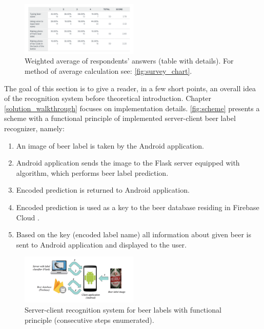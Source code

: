 \documentclass[11pt]{article}
\begin{document}
\begin{figure}[h]
\includegraphics[width=0.5\textwidth]{survey_table}
\centering
\caption{Weighted average of respondents' answers (table with details). For method of average calculation see: \autoref{fig:survey_chart}.}
\label{fig:survey_table}
\end{figure}

The goal of this section is to give a reader, in a few short points, an overall idea of the recognition system before theoretical introduction. Chapter \ref{solution_walkthrough} focuses on implementation details. \autoref{fig:scheme} presents a scheme with a functional principle of implemented server-client beer label recognizer, namely:
\begin{enumerate}
\item An image of beer label is taken by the Android \cite{android_guide} application. 
\item Android application sends the image to the Flask \cite{flask_docs} server equipped with algorithm, which performs beer label prediction.
\item Encoded prediction is returned to Android application.
\item Encoded prediction is used as a key to the beer database residing in Firebase Cloud \cite{firebase_database_docs}.
\item Based on the key (encoded label name) all information about given beer is sent to Android application and displayed to the user.
\end{enumerate}

\begin{figure}[h]
\includegraphics[width=0.5\textwidth]{scheme}
\centering
\caption{Server-client recognition system for beer labels with functional principle (consecutive steps enumerated).}
\label{fig:scheme}
\end{figure}
\clearpage
\end{document}
